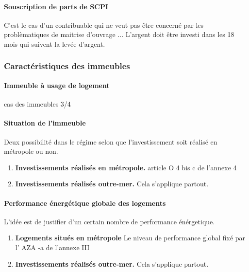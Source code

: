 			\paragraph{Souscription de parts de SCPI}

				C'est le cas d'un contribuable qui ne veut pas être concerné par les problèmatiques de maitrise d'ouvrage ... L'argent doit être investi dans les 18 mois qui suivent la levée d'argent.


		\subsubsection{Caractéristiques des immeubles}



			\paragraph{Immeuble à usage de logement}

			cas des immeubles 3/4

			\paragraph{Situation de l'immeuble}

				Deux possibilité dans le régime selon que l'investissement soit réalisé en métropole ou non.

				\begin{enumerate}[label=\textbf{\alpha*.}]
					\item \textbf{Investissements réalisés en métropole.} article O 4 bis c de l'annexe 4

					\item \textbf{Investissements réalisés outre-mer.} Cela s'applique partout.
				\end{enumerate}


			\paragraph{Performance énergétique globale des logements}

				L'idée est de justifier d'un certain nombre de performance énérgetique.

				\begin{enumerate}[label=\textbf{\alpha*.}]
					\item \textbf{Logements situés en métropole} Le niveau de performance global fixé par l' AZA -a de l'annexe III

					\item \textbf{Investissements réalisés outre-mer.} Cela s'applique partout.
				\end{enumerate}

